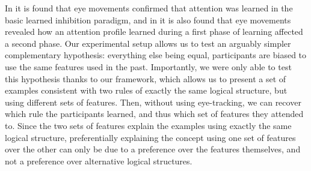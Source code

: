 In \cite{kruschke2005eye} it is found that eye movements confirmed that attention was learned in the basic learned inhibition paradigm, and in \cite{hoffman2010costs} it is also found that eye movements revealed how an attention profile learned during a first phase of learning affected a second phase. \color{black} Our experimental setup allows us to test an arguably simpler complementary hypothesis: everything else being equal, participants are biased to use the same features used in the past.  Importantly, we were only able to test this hypothesis thanks to our framework, which allows us to present a set of examples consistent with two rules of exactly the same logical structure, but using different sets of features. Then, without using eye-tracking, we can recover which rule the participants learned, and thus which set of features they attended to. Since the two sets of features explain the examples using exactly the same logical structure, preferentially explaining the concept using one set of features over the other can only be due to a preference over the features themselves, and not a preference over alternative logical structures. 

\color{black}



